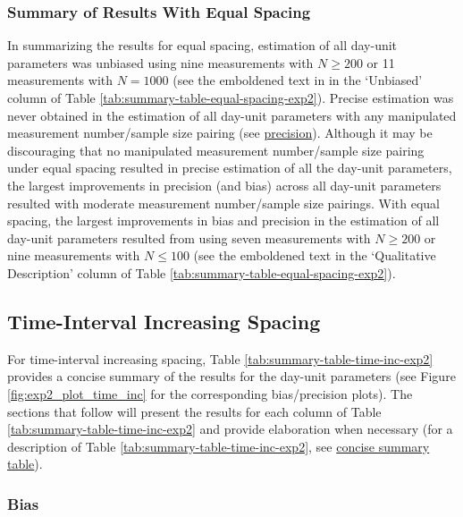 \documentclass[
12pt, %
twoside,
english]{guelphthesis}
\begin{document}
\hypertarget{summary-of-results-with-equal-spacing-1}{%
\subsubsection{Summary of Results With Equal Spacing}\label{summary-of-results-with-equal-spacing-1}}

In summarizing the results for equal spacing, estimation of all day-unit parameters was unbiased using nine measurements with \(N \ge 200\) or 11 measurements with \(N = 1000\) (see the emboldened text in in the `Unbiased' column of Table \ref{tab:summary-table-equal-spacing-exp2}). Precise estimation was never obtained in the estimation of all day-unit parameters with any manipulated measurement number/sample size pairing (see \protect\hyperlink{precision-time-inc-exp2}{precision}). Although it may be discouraging that no manipulated measurement number/sample size pairing under equal spacing resulted in precise estimation of all the day-unit parameters, the largest improvements in precision (and bias) across all day-unit parameters resulted with moderate measurement number/sample size pairings. With equal spacing, the largest improvements in bias and precision in the estimation of all day-unit parameters resulted from using seven measurements with \(N \ge 200\) or nine measurements with \(N \le 100\) (see the emboldened text in the `Qualitative Description' column of Table \ref{tab:summary-table-equal-spacing-exp2}).

\hypertarget{time-interval-increasing-spacing-1}{%
\subsection{Time-Interval Increasing Spacing}\label{time-interval-increasing-spacing-1}}

For time-interval increasing spacing, Table \ref{tab:summary-table-time-inc-exp2} provides a concise summary of the results for the day-unit parameters (see Figure \ref{fig:exp2_plot_time_inc} for the corresponding bias/precision plots). The sections that follow will present the results for each column of Table \ref{tab:summary-table-time-inc-exp2} and provide elaboration when necessary (for a description of Table \ref{tab:summary-table-time-inc-exp2}, see \protect\hyperlink{concise-example}{concise summary table}).

\hypertarget{bias-time-inc-exp2}{%
\subsubsection{Bias}\label{bias-time-inc-exp2}}
\end{document}
